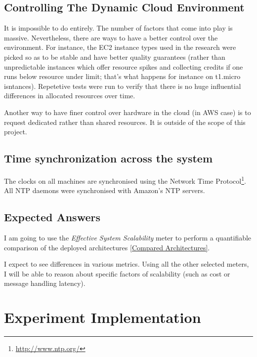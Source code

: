 \documentclass{uvamscse}
\begin{document}
\section{Controlling The Dynamic Cloud Environment}
It is impossible to do entirely. The number of factors that come into play is massive. Nevertheless, there are ways to have a better control over the environment. For instance, the EC2 instance types used in the research were picked so as to  be stable and have better quality guarantees (rather than unpredictable instances which offer resource spikes and collecting credits if one runs below resource under limit; that's what happens for instance on t1.micro isntances). Repetetive tests were run to verify that there is no huge influential differences in allocated resources over time.

Another way to have finer control over hardware in the cloud (in AWS case) is to request dedicated rather than shared resources. It is outside of the scope of this project.

\section{Time synchronization across the system}\label{Time synchronization across the system}
The clocks on all machines are synchronised using the Network Time Protocol\footnote{\url{http://www.ntp.org/}}. All NTP daemons were synchronised with Amazon's NTP servers.

\section{Expected Answers}\label{Expected Answers}
I am going to use the \textit{Effective System Scalability} meter to perform a quantifiable comparison of the deployed architectures \ref{Compared Architectures}.

I expect to see differences in various metrics. Using all the other selected meters, I will be able to reason about specific factors of scalability (such as cost or message handling latency).


\chapter{Experiment Implementation} \label{Experiment Implementation}
\end{document}
